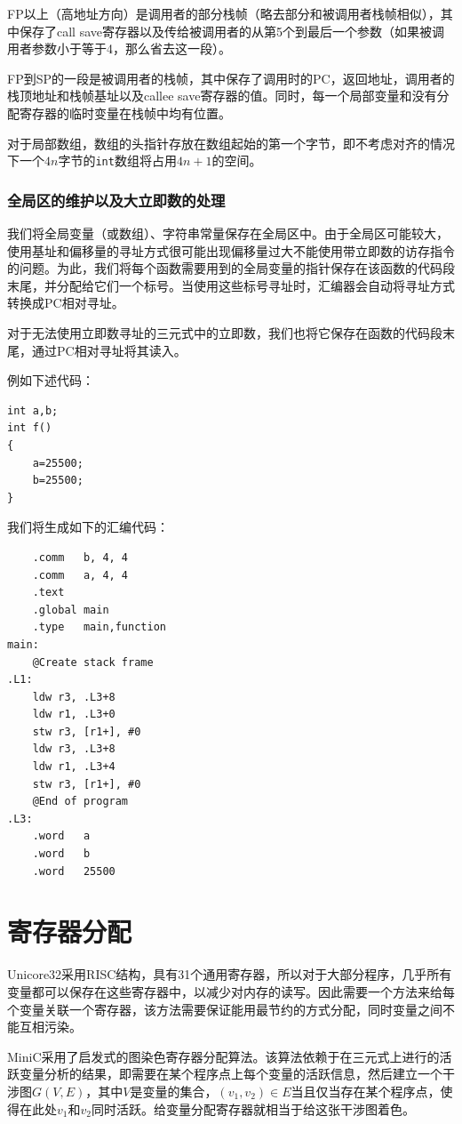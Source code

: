 FP以上（高地址方向）是调用者的部分栈帧（略去部分和被调用者栈帧相似），其中保存了call save寄存器以及传给被调用者的从第5个到最后一个参数（如果被调用者参数小于等于4，那么省去这一段）。

FP到SP的一段是被调用者的栈帧，其中保存了调用时的PC，返回地址，调用者的栈顶地址和栈帧基址以及callee save寄存器的值。同时，每一个局部变量和没有分配寄存器的临时变量在栈帧中均有位置。

对于局部数组，数组的头指针存放在数组起始的第一个字节，即不考虑对齐的情况下一个$4n$字节的\lstinline|int|数组将占用$4n+1$的空间。

\subsubsection{全局区的维护以及大立即数的处理}
我们将全局变量（或数组）、字符串常量保存在全局区中。由于全局区可能较大，使用基址和偏移量的寻址方式很可能出现偏移量过大不能使用带立即数的访存指令的问题。为此，我们将每个函数需要用到的全局变量的指针保存在该函数的代码段末尾，并分配给它们一个标号。当使用这些标号寻址时，汇编器会自动将寻址方式转换成PC相对寻址。

对于无法使用立即数寻址的三元式中的立即数，我们也将它保存在函数的代码段末尾，通过PC相对寻址将其读入。

例如下述代码：
\begin{lstlisting}
int a,b;
int f()
{
	a=25500;
	b=25500;
}

\end{lstlisting}
我们将生成如下的汇编代码：
\begin{verbatim}
	.comm	b, 4, 4
	.comm	a, 4, 4
	.text
	.global	main
	.type	main,function
main:
	@Create stack frame
.L1:
	ldw	r3, .L3+8
	ldw	r1, .L3+0
	stw	r3, [r1+], #0
	ldw	r3, .L3+8
	ldw	r1, .L3+4
	stw	r3, [r1+], #0
	@End of program
.L3:
	.word	a
	.word	b
	.word	25500
\end{verbatim}
\section{寄存器分配}
\label{registeralloc}
Unicore32采用RISC结构，具有31个通用寄存器，所以对于大部分程序，几乎所有变量都可以保存在这些寄存器中，以减少对内存的读写。因此需要一个方法来给每个变量关联一个寄存器，该方法需要保证能用最节约的方式分配，同时变量之间不能互相污染。

MiniC采用了启发式的图染色寄存器分配算法。该算法依赖于在三元式上进行的活跃变量分析的结果，即需要在某个程序点上每个变量的活跃信息，然后建立一个干涉图$G(V,E)$，其中$V$是变量的集合，$(v_1,v_2)\in E$当且仅当存在某个程序点，使得在此处$v_1$和$v_2$同时活跃。给变量分配寄存器就相当于给这张干涉图着色。

